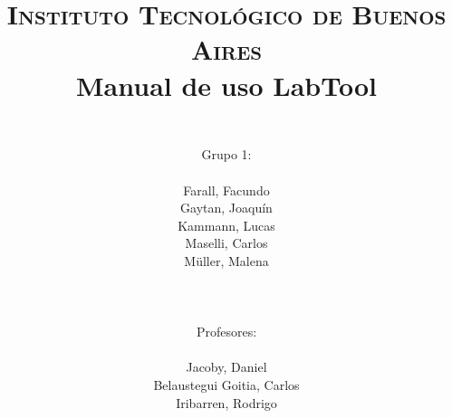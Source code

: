 



    \title{
        \normalfont \normalsize \textsc{Instituto Tecnol\'ogico de Buenos Aires} \\ [25pt]
        \huge Manual de uso LabTool\\
        \author{
            \\Grupo 1:\\\\Farall, Facundo\\Gaytan, Joaqu\'in\\Kammann, Lucas\\Maselli, Carlos\\ M\"uller, Malena\\ \\ \\ \\
            Profesores: \\\\ Jacoby, Daniel\\Belaustegui Goitia, Carlos\\Iribarren, Rodrigo \\ \\ \\ 
            } 
    }

    \maketitle
    \newpage

    \tableofcontents

    \newpage
    

